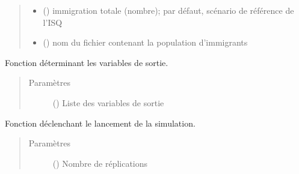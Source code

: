 \documentclass[letterpaper,10pt,french]{sphinxmanual}
\begin{document}
\begin{fulllineitems}
\begin{fulllineitems}
\begin{quote}
\begin{description}
\begin{itemize}
\item {} 
 () \textendash{} immigration totale (nombre); par défaut, scénario de référence de l’ISQ

\item {} 
 () \textendash{} nom du fichier contenant la population d’immigrants

\end{itemize}

\end{description}\end{quote}

\end{fulllineitems}


\begin{fulllineitems}
\label{\detokenize{code:simgen.model.set_statistics}}
Fonction déterminant les variables de sortie.
\begin{quote}\begin{description}
\item[{Paramètres}] \leavevmode
{} () \textendash{} Liste des variables de sortie

\end{description}\end{quote}

\end{fulllineitems}


\begin{fulllineitems}
\label{\detokenize{code:simgen.model.simulate}}
Fonction déclenchant le lancement de la simulation.
\begin{quote}\begin{description}
\item[{Paramètres}] \leavevmode
{} () \textendash{} Nombre de réplications


\end{description}
\end{quote}
\end{fulllineitems}
\end{fulllineitems}
\end{document}
